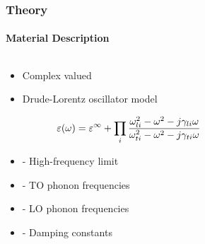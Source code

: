\documentclass[mathserif,18pt,xcolor=table]{beamer}
\begin{document}
\begin{frame}
  \frametitle{Theory}
  \framesubtitle{Material Description}
  \begin{columns}[T] %
    \begin{column}{.5\textwidth}
      \begin{itemize}
        \item Complex valued
        \item Drude-Lorentz oscillator model
      \end{itemize}
      \begin{equation} \nonumber
        \varepsilon(\omega) = \varepsilon^{\infty} + \prod_i\frac{\omega_{li}^2 - \omega^2 - j\gamma_{li} \omega}{\omega_{ti}^2 - \omega^2 - j\gamma_{ti} \omega}
        \label{eq:eps}
      \end{equation}
      \begin{itemize}
        \item[]{\makebox[.3cm][l]{$\E^{\inf}$} - High-frequency limit}
        \item[]{ - TO phonon frequencies}
        \item[]{ - LO phonon frequencies}
        \item[]{\makebox[.3cm][l]{$\gamma$} - Damping constants}
      \end{itemize}
    \end{column}
    \begin{column}[T]{.5\textwidth}
      \end{column}%
    \end{columns}
  \end{frame}
\end{document}

